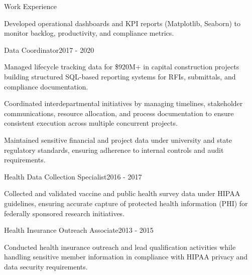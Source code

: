 \documentclass{resume}
\begin{document}
\begin{rSection}{Work Experience}
\begin{rSubsection}
                                    \item Developed operational dashboards and KPI reports (Matplotlib, Seaborn) to monitor backlog, productivity, and compliance metrics.
                            \end{rSubsection}
                    \begin{rSubsection}
                {Data Coordinator}{2017 - 2020}
                                    {}
                                {}
                                    \item Managed lifecycle tracking data for \$920M+ in capital construction projects building structured SQL-based reporting systems for RFIs, submittals, and compliance documentation.
                                    \item Coordinated interdepartmental initiatives by managing timelines, stakeholder communications, resource allocation, and process documentation to ensure consistent execution across multiple concurrent projects.
                                    \item Maintained sensitive financial and project data under university and state regulatory standards, ensuring adherence to internal controls and audit requirements.
                            \end{rSubsection}
                    \begin{rSubsection}
                {Health Data Collection Specialist}{2016 - 2017}
                                    {}
                                {}
                                    \item Collected and validated vaccine and public health survey data under HIPAA guidelines, ensuring accurate capture of protected health information (PHI) for federally sponsored research initiatives.
                            \end{rSubsection}
                    \begin{rSubsection}
                {Health Insurance Outreach Associate}{2013 - 2015}
                                    {}
                                {}
                                    \item Conducted health insurance outreach and lead qualification activities while handling sensitive member information in compliance with HIPAA privacy and data security requirements.
                            \end{rSubsection}
            \end{rSection}
\end{document}

